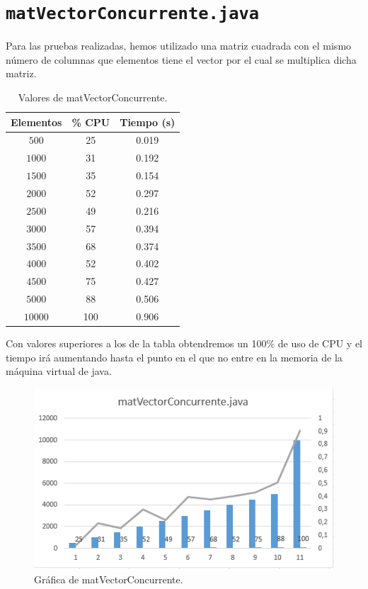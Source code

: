 \documentclass[12pt,letterpaper]{article}
\begin{document}
\newpage
\section{\texttt{matVectorConcurrente.java}}
\noindent
Para las pruebas realizadas, hemos utilizado una matriz cuadrada con el mismo número de columnas que elementos tiene el vector por el cual se multiplica dicha matriz.
\begin{center}
	\begin{table}[htbp]
		\begin{center}
			\begin{tabular}{|c|c|c|}
				\hline
				\textbf{Elementos} & \textbf{\% CPU} & \textbf{Tiempo (s)}  \\
				\hline 
				$500$ & 25 & 0.019\\ \hline	
				$1000$ & 31 & 0.192\\ \hline
				$1500$ & 35 & 0.154\\ \hline
				$2000$ & 52 & 0.297\\ \hline
				$2500$ & 49 & 0.216\\ \hline
				$3000$ & 57 & 0.394\\ \hline
				$3500$ & 68 & 0.374\\ \hline
				$4000$ & 52 & 0.402\\ \hline
				$4500$ & 75 & 0.427\\ \hline
				$5000$ & 88 & 0.506\\ \hline				
				$10000$ & 100 & 0.906\\ \hline	
			\end{tabular}
			\caption{Valores de matVectorConcurrente.}
			\label{tabla:Valores de matVectorConcurrente}
		\end{center}
	\end{table}
\end{center}
\noindent
Con valores superiores a los de la tabla obtendremos un 100\% de uso de CPU y el tiempo irá aumentando hasta el punto en el que no entre en la memoria de la máquina virtual de java.
\begin{figure}
	\begin{center}
		\includegraphics[scale=1]{matVectorConcurrente.png}
		\caption{Gráfica de matVectorConcurrente.}
		\label{fig: matVectorConcurrente}
	\end{center}	
\end{figure}
\end{document}
